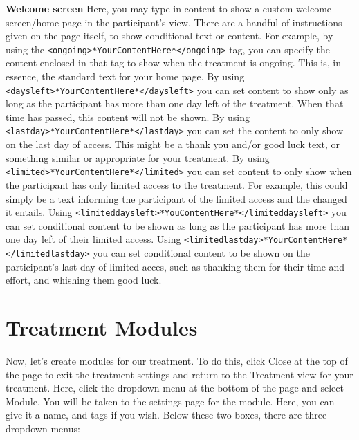 \documentclass[]{book}
\begin{document}
\textbf{Welcome screen}
Here, you may type in content to show a custom welcome screen/home page in the participant's view. There are a handful of instructions given on the page itself, to show conditional text or content.
For example, by using the \texttt{\textless{}ongoing\textgreater{}*YourContentHere*\textless{}/ongoing\textgreater{}} tag, you can specify the content enclosed in that tag to show when the treatment is ongoing. This is, in essence, the standard text for your home page.
By using \texttt{\textless{}daysleft\textgreater{}*YourContentHere*\textless{}/daysleft\textgreater{}} you can set content to show only as long as the participant has more than one day left of the treatment. When that time has passed, this content will not be shown.
By using \texttt{\textless{}lastday\textgreater{}*YourContentHere*\textless{}/lastday\textgreater{}} you can set the content to only show on the last day of access. This might be a thank you and/or good luck text, or something similar or appropriate for your treatment.
By using \texttt{\textless{}limited\textgreater{}*YourContentHere*\textless{}/limited\textgreater{}} you can set content to only show when the participant has only limited access to the treatment. For example, this could simply be a text informing the participant of the limited access and the changed it entails.
Using \texttt{\textless{}limiteddaysleft\textgreater{}*YouContentHere*\textless{}/limiteddaysleft\textgreater{}} you can set conditional content to be shown as long as the participant has more than one day left of their limited access.
Using \texttt{\textless{}limitedlastday\textgreater{}*YourContentHere*\textless{}/limitedlastday\textgreater{}} you can set conditional content to be shown on the participant's last day of limited acces, such as thanking them for their time and effort, and whishing them good luck.

\hypertarget{treatment-modules}{%
\section{Treatment Modules}\label{treatment-modules}}

Now, let's create modules for our treatment. To do this, click Close at the top of the page to exit the treatment settings and return to the Treatment view for your treatment. Here, click the dropdown menu at the bottom of the page and select Module. You will be taken to the settings page for the module. Here, you can give it a name, and tags if you wish. Below these two boxes, there are three dropdown menus:
\end{document}
